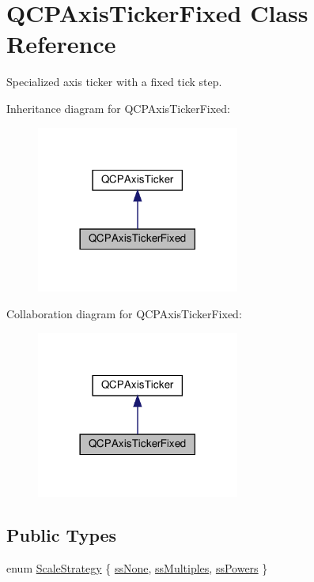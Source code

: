 \hypertarget{classQCPAxisTickerFixed}{}\section{Q\+C\+P\+Axis\+Ticker\+Fixed Class Reference}
\label{classQCPAxisTickerFixed}


Specialized axis ticker with a fixed tick step.  




Inheritance diagram for Q\+C\+P\+Axis\+Ticker\+Fixed\+:\nopagebreak
\begin{figure}[H]
\begin{center}
\leavevmode
\includegraphics[width=189pt]{classQCPAxisTickerFixed__inherit__graph}
\end{center}
\end{figure}


Collaboration diagram for Q\+C\+P\+Axis\+Ticker\+Fixed\+:\nopagebreak
\begin{figure}[H]
\begin{center}
\leavevmode
\includegraphics[width=189pt]{classQCPAxisTickerFixed__coll__graph}
\end{center}
\end{figure}
\subsection*{Public Types}
\begin{DoxyCompactItemize}
\item 
enum \hyperlink{classQCPAxisTickerFixed_a15b3d38b935d404b1311eb85cfb6a439}{Scale\+Strategy} \{ \hyperlink{classQCPAxisTickerFixed_a15b3d38b935d404b1311eb85cfb6a439a6621275677a05caa0de204ae3956b85f}{ss\+None}, 
\hyperlink{classQCPAxisTickerFixed_a15b3d38b935d404b1311eb85cfb6a439a22f651785f6412645837421896561104}{ss\+Multiples}, 
\hyperlink{classQCPAxisTickerFixed_a15b3d38b935d404b1311eb85cfb6a439ac39d5813e9165ebd494307ae61ce5dce}{ss\+Powers}
 \}
\end{DoxyCompactItemize}
